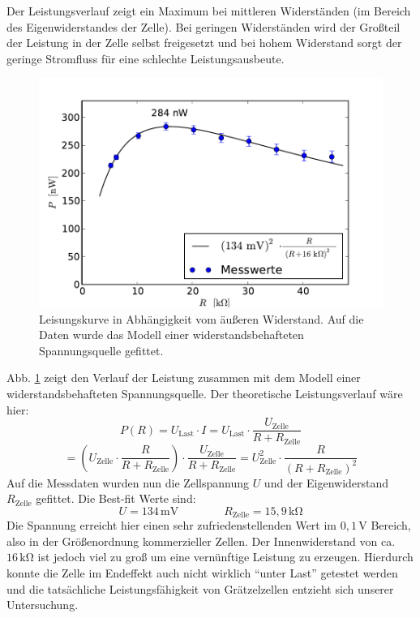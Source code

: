 \documentclass[11pt]{scrartcl}
\newcommand{\unit}[1]{\ensuremath{\,\mathrm{#1}}} %
\begin{document}
Der Leistungsverlauf zeigt ein Maximum bei mittleren Widerständen (im Bereich des Eigenwiderstandes der Zelle). Bei geringen Widerständen wird der Großteil der Leistung in der Zelle selbst freigesetzt und bei hohem Widerstand sorgt der geringe Stromfluss für eine schlechte Leistungsausbeute.
\begin{figure}[ht]
\begin{center}
\includegraphics[width=1.0\textwidth]{images/graetzel_leistung.pdf}
\end{center}
\vspace{-1.5\baselineskip}
\caption{Leisungskurve in Abhängigkeit vom äußeren Widerstand. Auf die Daten wurde das Modell einer widerstandsbehafteten Spannungsquelle gefittet.}
\label{leistungskurve}
\end{figure}
Abb. \ref{leistungskurve} zeigt den Verlauf der Leistung zusammen mit dem Modell einer widerstandsbehafteten Spannungsquelle. Der theoretische Leistungsverlauf wäre hier:
\[
P(R)= U_{\text{Last}}\cdot I
= U_{\text{Last}}\cdot \frac{U_{\text{Zelle}}}{R+R_{\text{Zelle}}}
\]
\[
= \left(U_{\text{Zelle}}\cdot \frac{R}{R+R_{\text{Zelle}}}\right)\cdot \frac{U_{\text{Zelle}}}{R+R_{\text{Zelle}}}
= U_{\text{Zelle}}^2\cdot \frac{R}{(R+R_{\text{Zelle}})^2}
\]
Auf die Messdaten wurden nun die Zellspannung $U$ und der Eigenwiderstand $R_{\text{Zelle}}$ gefittet. Die Best-fit Werte sind:
\[
U = 134\unit{mV}
\qquad\qquad
R_{\text{Zelle}} = 15,9\unit{k\Omega}
\]
Die Spannung erreicht hier einen sehr zufriedenstellenden Wert im $0,1\unit{V}$ Bereich, also in der Größenordnung kommerzieller Zellen. Der Innenwiderstand von ca. $16\unit{k\Omega}$ ist jedoch viel zu groß um eine vernünftige Leistung zu erzeugen. Hierdurch konnte die Zelle im Endeffekt auch nicht wirklich "`unter Last"' getestet werden und die tatsächliche Leistungsfähigkeit von Grätzelzellen entzieht sich unserer Untersuchung.
\end{document}

